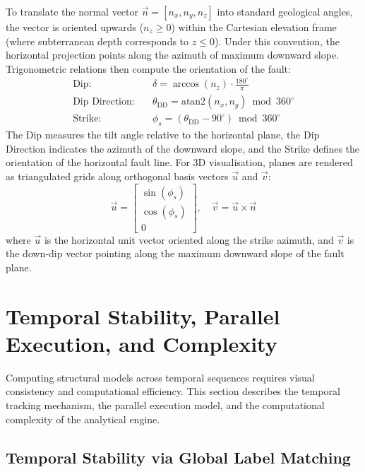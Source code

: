 To translate the normal vector $\vec{n} = [n_x, n_y, n_z]$ into standard geological angles, the vector is oriented upwards ($n_z \ge 0$) within the Cartesian elevation frame (where subterranean depth corresponds to $z \le 0$). Under this convention, the horizontal projection points along the azimuth of maximum downward slope. Trigonometric relations then compute the orientation of the fault:
\begin{align}
    \text{Dip}: \quad & \delta = \arccos(n_z) \cdot \frac{180^\circ}{\pi} \label{eq:dip} \\
    \text{Dip Direction}: \quad & \theta_\text{DD} = \text{atan2}(n_x, n_y) \bmod 360^\circ \label{eq:dip-dir} \\
    \text{Strike}: \quad & \phi_s = (\theta_\text{DD} - 90^\circ) \bmod 360^\circ \label{eq:strike}
\end{align}
The Dip measures the tilt angle relative to the horizontal plane, the Dip Direction indicates the azimuth of the downward slope, and the Strike defines the orientation of the horizontal fault line. For 3D visualisation, planes are rendered as triangulated grids along orthogonal basis vectors $\vec{u}$ and $\vec{v}$:
\begin{equation}
    \vec{u} = \begin{bmatrix} \sin(\phi_s) \\ \cos(\phi_s) \\ 0 \end{bmatrix}, \quad \vec{v} = \vec{u} \times \vec{n}
    \label{eq:basis-vectors}
\end{equation}
where $\vec{u}$ is the horizontal unit vector oriented along the strike azimuth, and $\vec{v}$ is the down-dip vector pointing along the maximum downward slope of the fault plane.

\section{Temporal Stability, Parallel Execution, and Complexity}
\label{sec:label-matching}
\label{sec:parallel}

Computing structural models across temporal sequences requires visual consistency and computational efficiency. This section describes the temporal tracking mechanism, the parallel execution model, and the computational complexity of the analytical engine.

\subsection{Temporal Stability via Global Label Matching}

